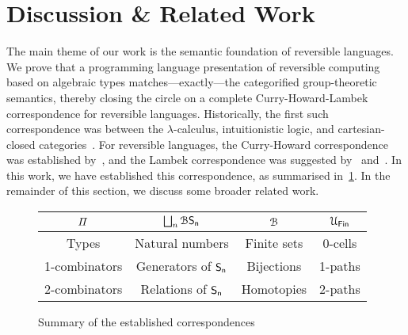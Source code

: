 \section{Discussion \& Related Work}
\label{sec:discussion}


The main theme of our work is the semantic foundation of reversible languages. We prove that a programming language
presentation of reversible computing based on algebraic types matches---exactly---the categorified group-theoretic
semantics, thereby closing the circle on a complete Curry-Howard-Lambek correspondence for reversible languages.
Historically, the first such correspondence was between the $\lambda$-calculus, intuitionistic logic, and
cartesian-closed categories~\cite{curryCurryEssaysCombinatory1980}. For reversible languages, the Curry-Howard
correspondence was established by~\citet{sparksSuperstructuralReversibleLogic2014}, and the Lambek correspondence was
suggested by~\citet{caretteComputingSemiringsWeak2016} and~\citet{threemodels}. In this work, we have established this
correspondence, as summarised in~\cref{fig:table-summary}. In the remainder of this section, we discuss some broader
related work.

\begin{figure}
    \begin{center}
        \begin{tabular}{|c|c|c|c|}
            \hline
            \rowcolor{lightgray} $\mathit{\Pi}$ & $\bigsqcup_n \mathcal{B}\Sn $ & $\BFin$     & $\UFin$ \tabularnewline
            \hline
            Types                          & Natural numbers               & Finite sets & 0-cells \tabularnewline
            \hline
            1-combinators                  & Generators of $\Sn$           & Bijections  & 1-paths \tabularnewline
            \hline
            2-combinators                  & Relations of $\Sn$            & Homotopies  & 2-paths \tabularnewline
            \hline
        \end{tabular}
    \end{center}
    \caption{Summary of the established correspondences}
    \label{fig:table-summary}
\end{figure}

